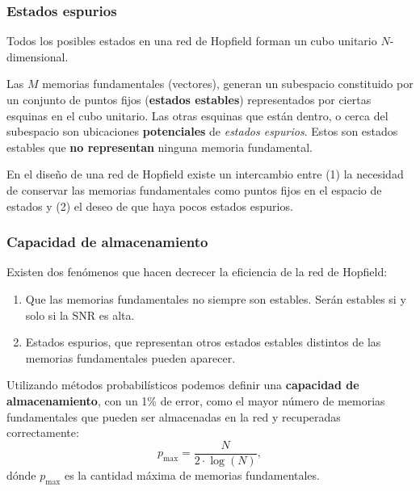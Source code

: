 \documentclass[10pt,a4paper]{article}
\begin{document}
\subsubsection{Estados espurios}

Todos los posibles estados en una red de Hopfield forman un cubo unitario $N$-dimensional.

Las $M$ memorias fundamentales (vectores), generan un subespacio constituido por un conjunto de puntos fijos (\textbf{estados estables}) representados por ciertas esquinas en el cubo unitario. Las otras esquinas que están dentro, o cerca del subespacio son ubicaciones \textbf{potenciales} de \textit{estados espurios}. Estos son estados estables que \textbf{no representan} ninguna memoria fundamental.

En el diseño de una red de Hopfield existe un intercambio entre (1) la necesidad de conservar las memorias fundamentales como puntos fijos en el espacio de estados y (2) el deseo de que haya pocos estados espurios.

\subsubsection{Capacidad de almacenamiento}

Existen dos fenómenos que hacen decrecer la eficiencia de la red de Hopfield:
\begin{enumerate}
\item Que las memorias fundamentales no siempre son estables. Serán estables si y solo si la SNR es alta.
\item Estados espurios, que representan otros estados estables distintos de las memorias fundamentales pueden aparecer.
\end{enumerate}

Utilizando métodos probabilísticos podemos definir una \textbf{capacidad de almacenamiento}, con un 1\% de error, como el mayor número de memorias fundamentales que pueden ser almacenadas en la red y recuperadas correctamente:
\[p_{\max} = \frac{N}{2 \cdot \log(N)},\]
dónde $p_{\max}$ es la cantidad máxima de memorias fundamentales.
\end{document}
